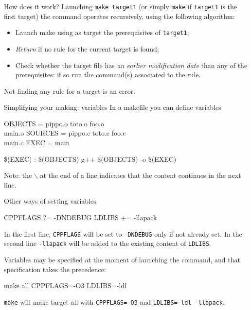 \documentclass[10pt,aspectratio=169]{beamer}
\begin{document}
\begin{frame}{How does it work?}
Launching \texttt{make target1} (or simply \texttt{make} if
\texttt{target1} is the first target) the command operates
\alert{recursively}, using the following algorithm:
\begin{itemize}
\item Launch make using as target the prerequisites of \texttt{target1};
\item \emph{Return} if no rule for the current target is found;
\item Check whether the target file has \emph{an earlier
    modification date} than any of the prerequisites: if so \alert{run
    the command(s) associated to the rule}.
\end{itemize}

Not finding any rule for a target is an error.
\end{frame}


\begin{frame}{Simplifying your making: variables}
In a makefile you can define variables

\begin{semiverbatim}
OBJECTS = pippo.o toto.o foo.o \\ \newline
          main.o\newline
SOURCES = pippo.c toto.c foo.c \\ \newline
          main.c\newline
EXEC    = main\newline

\$(EXEC) : \$(OBJECTS)\newline
\phantom{xx} g++ \$(OBJECTS) -o \$(EXEC)\newline
\end{semiverbatim}
\medskip

Note: the $\backslash$ at the end of a line indicates that the content continues in the next line.
\end{frame}

\begin{frame}{Other ways of setting variables}
	
	\begin{semiverbatim}
		CPPFLAGS ?= -DNDEBUG\newline
		LDLIBS += -llapack
	\end{semiverbatim}
In the first line, \texttt{CPPFLAGS} will be set to \texttt{-DNDEBUG} only if \alert{not already set}.
In the second line \texttt{-llapack} will be added to the existing content of \texttt{LDLIBS}.
\medskip

Variables may be specified at the moment of launching the command, and that specification takes the precedence:
\begin{semiverbatim}
	make all CPPFLAGS=-O3 LDLIBS=-ldl
\end{semiverbatim}
\texttt{make} will make target \alert{all} with  \texttt{CPPFLAGS=-O3} and \texttt{LDLIBS=-ldl -llapack}.
\end{frame}
\end{document}
